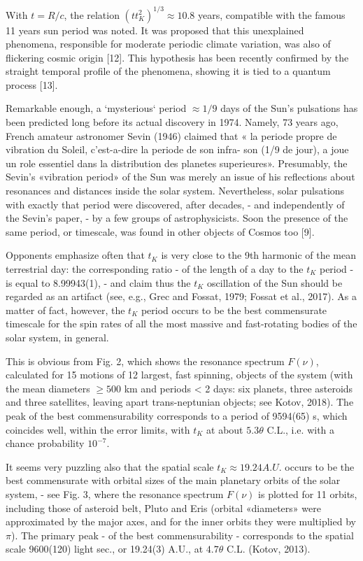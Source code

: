 \documentclass[twoside,draft]{article}
\begin{document}
\begin{sloppypar}
{With $t = R/c$, the relation $(t t_{K}^2)^{1/3} \approx 10.8$ years, compatible with the famous 11 years sun period
was noted. It was proposed that this unexplained phenomena, responsible for moderate periodic
climate variation, was also of flickering cosmic origin [12]. This hypothesis has been recently
confirmed by the straight temporal profile of the phenomena, showing it is tied to a quantum
process [13].

Remarkable enough, a `mysterious` period $\approx 1/9$ days of the Sun's pulsations has been predicted
long before its actual discovery in 1974. Namely, 73 years ago, French amateur astronomer Sevin
(1946) claimed that « la periode propre de vibration du Soleil, c'est-a-dire la periode de son infra-
son (1/9 de jour), a joue un role essentiel dans la distribution des planetes superieures». Presumably,
the Sevin's «vibration period» of the Sun was merely an issue of his reflections about resonances
and distances inside the solar system. Nevertheless, solar pulsations with exactly that period were
discovered, after decades, - and independently of the Sevin's paper, - by a few groups of
astrophysicists. Soon the presence of the same period, or timescale, was found in other objects of
Cosmos too [9].

Opponents emphasize often that $t_{K}$ is very close to the 9th harmonic of the mean terrestrial day: the corresponding ratio - of the length of a day to the $t_{K}$ period - is equal to 8.99943(1), - and claim
thus the $t_{K}$ oscillation of the Sun should be regarded as an artifact (see, e.g., Grec and Fossat, 1979;
Fossat et al., 2017). As a matter of fact, however, the $t_{K}$ period occurs to be the best commensurate
timescale for the spin rates of all the most massive and fast-rotating bodies of the solar system, in
general.

This is obvious from Fig. 2, which shows the resonance spectrum $F( \nu )$, calculated for 15
motions of 12 largest, fast spinning, objects of the system (with the mean diameters $\geq 500$ km and
periods < 2 days: six planets, three asteroids and three satellites, leaving apart trans-neptunian
objects; see Kotov, 2018). The peak of the best commensurability corresponds to a period of
9594(65) s, which coincides well, within the error limits, with $t_K$ at about $5.3 \theta$ C.L., i.e. with a
chance probability $10^{-7}$.

It seems very puzzling also that the spatial scale $t_{K} \approx 19.24 A.U.$ occurs to be the best
commensurate with orbital sizes of the main planetary orbits of the solar system, - see Fig. 3,
where the resonance spectrum $F( \nu )$ is plotted for 11 orbits, including those of asteroid belt, Pluto
and Eris (orbital «diameters» were approximated by the major axes, and for the inner orbits they
were multiplied by $\pi$). The primary peak - of the best commensurability - corresponds to the
spatial scale 9600(120) light sec., or 19.24(3) A.U., at $4.7 \theta$ C.L. (Kotov, 2013).

}
\end{sloppypar}
\end{document}
